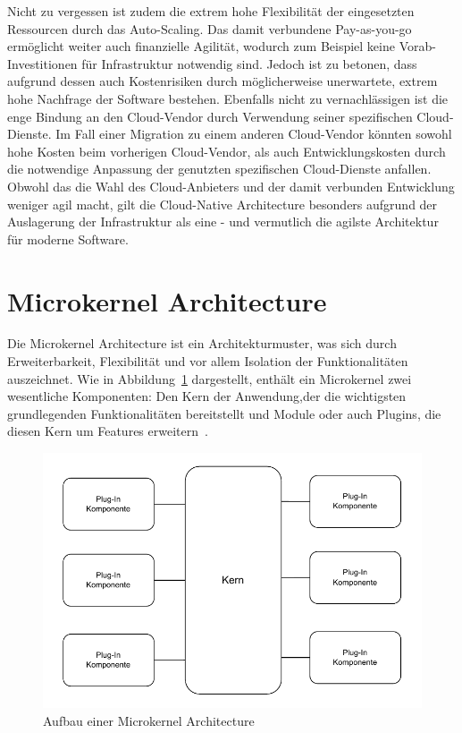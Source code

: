\documentclass[acmtog]{acmart}
\begin{document}
Nicht zu vergessen ist zudem die extrem hohe Flexibilität der eingesetzten Ressourcen durch das Auto-Scaling.
Das damit verbundene Pay-as-you-go ermöglicht weiter auch finanzielle Agilität, wodurch zum Beispiel keine Vorab-Investitionen für Infrastruktur notwendig sind.
Jedoch ist zu betonen, dass aufgrund dessen auch Kostenrisiken durch möglicherweise unerwartete, extrem hohe Nachfrage der Software bestehen.
Ebenfalls nicht zu vernachlässigen ist die enge Bindung an den Cloud-Vendor durch Verwendung seiner spezifischen Cloud-Dienste.
Im Fall einer Migration zu einem anderen Cloud-Vendor könnten sowohl hohe Kosten beim vorherigen Cloud-Vendor, als auch Entwicklungskosten durch die notwendige
Anpassung der genutzten spezifischen Cloud-Dienste anfallen.
Obwohl das die Wahl des Cloud-Anbieters und der damit verbunden Entwicklung weniger agil macht, gilt die Cloud-Native Architecture besonders aufgrund der Auslagerung
der Infrastruktur als eine - und vermutlich die agilste Architektur für moderne Software.

\section{Microkernel Architecture}
\label{sec:microkernel}
Die Microkernel Architecture ist ein Architekturmuster, was sich durch Erweiterbarkeit, Flexibilität und vor allem Isolation der Funktionalitäten auszeichnet.
Wie in Abbildung~\ref{fig:microkernel} dargestellt, enthält ein Microkernel zwei wesentliche Komponenten: Den Kern der Anwendung,der die wichtigsten grundlegenden Funktionalitäten bereitstellt und Module oder auch Plugins,
die diesen Kern um Features erweitern~\cite[21-22]{architecturePatterns}.

\begin{figure}[!h]
  \centering
  \includegraphics[width=\linewidth]{images/microkernel/microkernel}
  \caption{Aufbau einer Microkernel Architecture}
  \label{fig:microkernel}
\end{figure}
\end{document}
